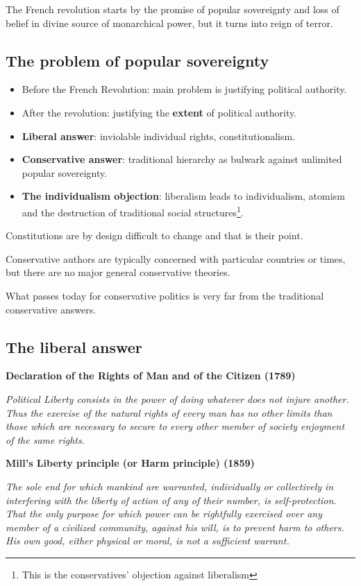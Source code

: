 The French revolution starts by the promise of popular sovereignty and loss of
belief in divine source of monarchical power, but it turns into reign of
terror.

\subsection{The problem of popular sovereignty}

\begin{itemize}
    \item Before the French Revolution: main problem is justifying political
    authority.
    \item After the revolution: justifying the \textbf{extent} of political
    authority.
    \item \textbf{Liberal answer}: inviolable individual rights,
    constitutionalism.
    \item \textbf{Conservative answer}: traditional hierarchy as bulwark
    against unlimited popular sovereignty.
    \item \textbf{The individualism objection}: liberalism leads to
    individualism, atomism and the destruction of traditional social
    structures\footnote{This is the conservatives' objection against
    liberalism}.
\end{itemize}

Constitutions are by design difficult to change and that is their point.

Conservative authors are typically concerned with particular countries or
times, but there are no major general conservative theories.

What passes today for conservative politics is very far from the traditional
conservative answers.

\subsection{The liberal answer}

\textbf{Declaration of the Rights of Man and of the Citizen (1789)}

\textit{Political Liberty consists in the power of doing whatever does not
injure another. Thus the exercise of the natural rights of every man has no
other limits than those which are necessary to secure to every other member
of society enjoyment of the same rights.}

\textbf{Mill's Liberty principle (or Harm principle) (1859)}

\textit{The sole end for which mankind are warranted, individually or
collectively in interfering with the liberty of action of any of their number,
is self-protection. That the only purpose for which power can be rightfully
exercised over any member of a civilized community, against his will, is to
prevent harm to others. His own good, either physical or moral, is not
a sufficient warrant.}

